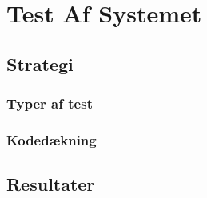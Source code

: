\chapter{Test Af Systemet}
\label{Test}

\section{Strategi}
\label{Test_Strat}

\subsection{Typer af test}
\label{Test_Strat_types}

\subsection{Kodedækning}
\label{Test_Strat_coverage}

\section{Resultater}
\label{Test_Results}